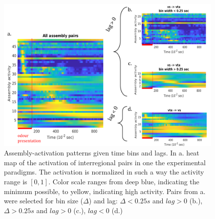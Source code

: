 \begin{figure}[h!]
    \centering
    \includegraphics[scale=0.56]{figures/AsActPerBinLag1.png}
    \caption{Assembly-activation patterns given time bins and lags. In a. heat map of the activation of interregional pairs in one the experimental paradigms. The activation is normalized in such a way the activity range is $[0,1]$. Color scale ranges from deep blue, indicating the minimum possible, to yellow, indicating high activity. Pairs from a. were selected for bin size ($\Delta$) and lag: $\Delta < 0.25 s$ and $lag > 0$ (b.), $\Delta > 0.25 s$ and $lag > 0$ (c.), $lag < 0$ (d.)}
    \label{fig:AsActBinLag}
\end{figure}
